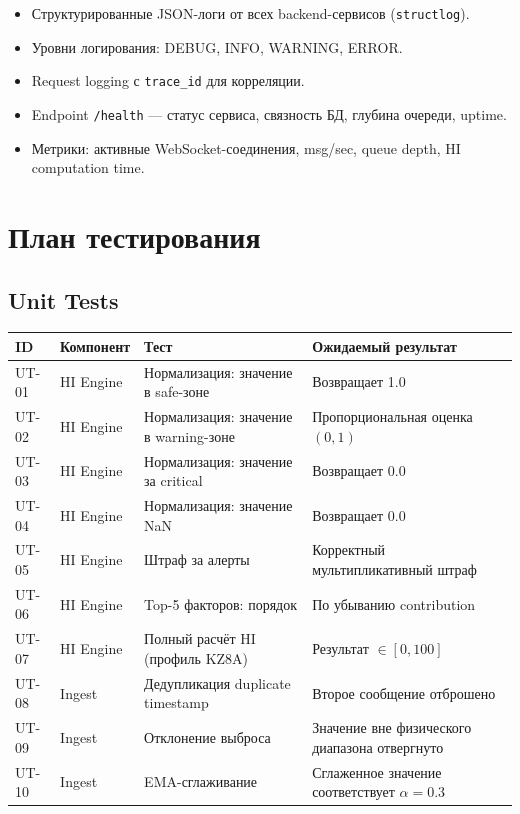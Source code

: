 \documentclass[12pt,a4paper]{article}
\newcommand{\code}[1]{\texttt{#1}}
\begin{document}
\begin{itemize}[nosep]
  \item Структурированные JSON-логи от всех backend-сервисов (\code{structlog}).
  \item Уровни логирования: DEBUG, INFO, WARNING, ERROR.
  \item Request logging с \code{trace\_id} для корреляции.
  \item Endpoint \code{/health} --- статус сервиса, связность БД, глубина очереди, uptime.
  \item Метрики: активные WebSocket-соединения, msg/sec, queue depth, HI computation time.
\end{itemize}


\section{План тестирования}

\subsection{Unit Tests}

\begin{longtable}{l L{3cm} L{4.5cm} L{4.5cm}}
\toprule
\textbf{ID} & \textbf{Компонент} & \textbf{Тест} & \textbf{Ожидаемый результат} \\
\midrule
\endhead
UT-01 & HI Engine & Нормализация: значение в safe-зоне & Возвращает 1.0 \\
UT-02 & HI Engine & Нормализация: значение в warning-зоне & Пропорциональная оценка $(0, 1)$ \\
UT-03 & HI Engine & Нормализация: значение за critical & Возвращает 0.0 \\
UT-04 & HI Engine & Нормализация: значение NaN & Возвращает 0.0 \\
UT-05 & HI Engine & Штраф за алерты & Корректный мультипликативный штраф \\
UT-06 & HI Engine & Top-5 факторов: порядок & По убыванию contribution \\
UT-07 & HI Engine & Полный расчёт HI (профиль KZ8A) & Результат $\in [0, 100]$ \\
UT-08 & Ingest & Дедупликация duplicate timestamp & Второе сообщение отброшено \\
UT-09 & Ingest & Отклонение выброса & Значение вне физического диапазона отвергнуто \\
UT-10 & Ingest & EMA-сглаживание & Сглаженное значение соответствует $\alpha = 0.3$ \\
\bottomrule
\end{longtable}
\end{document}

